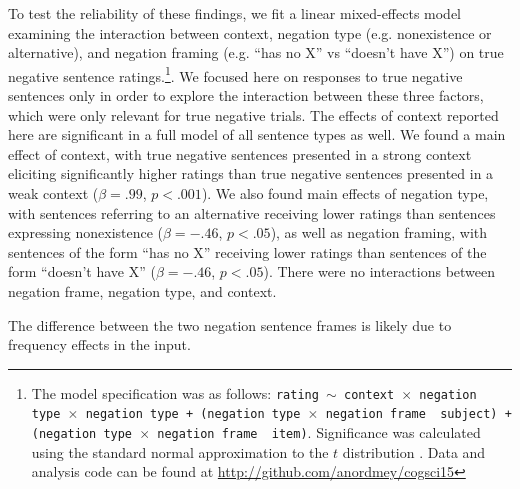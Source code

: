 \documentclass[10pt,letterpaper]{article}
\begin{document}

 
To test the reliability of these findings, we fit a linear mixed-effects model examining the interaction between context, negation type (e.g. nonexistence or alternative), and negation framing (e.g. ``has no X'' vs ``doesn't have X'') on true negative sentence ratings.\footnote{ The model specification was as follows: \texttt{rating $\sim$ context~$\times$~negation type~$\times$~negation type + (negation type~$\times$~negation frame~\textbar~subject) +  (negation type~$\times$~negation frame~\textbar~item)}.  Significance was calculated using the standard normal approximation to the $t$ distribution \cite{barr2013}. Data and analysis code can be found at \href{http://github.com/anordmey/cogsci15}{http://github.com/anordmey/cogsci15}}.  We focused here on responses to true negative sentences only in order to explore the interaction between these three factors, which were only relevant for true negative trials.  The effects of context reported here are significant in a full model of all sentence types as well. We found a main effect of context, with true negative sentences presented in a strong context eliciting significantly higher ratings than true negative sentences presented in a weak context ($\beta= .99$, $p< .001$).  We also found main effects of negation type, with sentences referring to an alternative receiving lower ratings than sentences expressing nonexistence ($\beta= -.46$, $p< .05$), as well as negation framing, with sentences of the form ``has no X'' receiving lower ratings than sentences of the form ``doesn't have X''  ($\beta= -.46$, $p< .05$).  There were no interactions between negation frame, negation type, and context.  

The difference between the two negation sentence frames is likely due to frequency effects in the input. 
\end{document}
